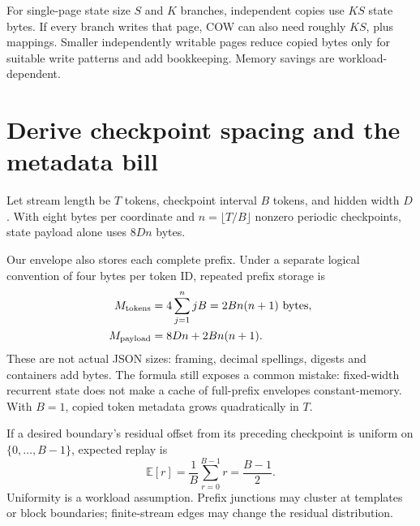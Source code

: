 For single-page state size $S$ and $K$ branches, independent copies use $KS$
state bytes. If every branch writes that page, COW can also need roughly $KS$,
plus mappings. Smaller independently writable pages reduce copied bytes only
for suitable write patterns and add bookkeeping. Memory savings are
workload-dependent.

\section{Derive checkpoint spacing and the metadata bill}

Let stream length be $T$ tokens, checkpoint interval $B$ tokens, and hidden
width $D$. With eight bytes per coordinate and
$n=\lfloor T/B\rfloor$ nonzero periodic checkpoints, state payload alone
uses $8Dn$ bytes.

Our envelope also stores each complete prefix. Under a separate logical
convention of four bytes per token ID, repeated prefix storage is
\begin{align}
 M_{\rm tokens}&=4\sum_{j=1}^{n}jB=2Bn(n+1)\ \text{bytes},\\
 M_{\rm payload}&=8Dn+2Bn(n+1).
 \label{eq:storage}
\end{align}
These are not actual JSON sizes: framing, decimal spellings, digests and
containers add bytes. The formula still exposes a common mistake:
fixed-width recurrent state does not make a cache of full-prefix envelopes
constant-memory. With $B=1$, copied token metadata grows quadratically in $T$.

If a desired boundary's residual offset from its preceding checkpoint is
uniform on $\{0,\ldots,B-1\}$, expected replay is
\begin{equation}
 \mathbb{E}[r]=\frac{1}{B}\sum_{r=0}^{B-1}r=\frac{B-1}{2}.
 \label{eq:replay}
\end{equation}
Uniformity is a workload assumption. Prefix junctions may cluster at templates
or block boundaries; finite-stream edges may change the residual distribution.


\begin{center}\end{center}

